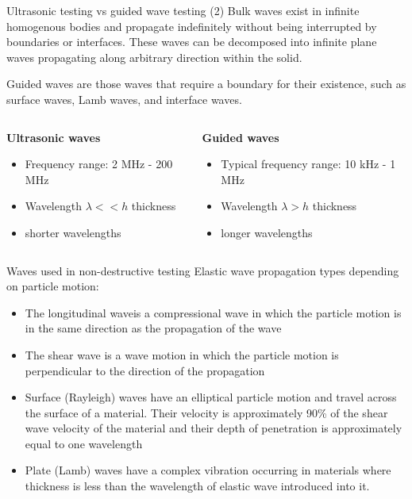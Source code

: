 \documentclass[10pt,aspectratio=169]{beamer} %
\begin{document}
\begin{frame}{Ultrasonic testing vs guided wave testing (2)}
\alert{Bulk waves} exist in infinite homogenous bodies and propagate indefinitely without being interrupted by boundaries or interfaces. 
These waves can be decomposed into infinite plane waves propagating along arbitrary direction within the solid.

\alert{Guided waves} are those waves that require a boundary for their existence, such as surface waves, Lamb waves, and interface waves.
\vspace{5mm}
\begin{columns}[T]
	\begin{column}{0.5\textwidth}
	\textbf{Ultrasonic waves}	
	\begin{itemize}
		\item Frequency range: 2 MHz - 200 MHz
		\item Wavelength \(\lambda << h\) thickness 
		\item shorter wavelengths
	\end{itemize}
	\end{column}
	\begin{column}{0.5\textwidth}
	\textbf{Guided waves}	
	\begin{itemize}
		\item Typical frequency range: 10 kHz - 1 MHz
		\item Wavelength \(\lambda > h\) thickness 
		\item longer wavelengths
	\end{itemize}
	\end{column}
\end{columns}			
\end{frame}
\note{
	
}
\begin{frame}{Waves used in non-destructive testing}
Elastic wave propagation types depending on particle motion:
\begin{itemize}
	\item  \alert{The longitudinal wave}is a compressional wave in which the particle motion is in the same direction as the propagation of the wave
	\item \alert{The shear wave} is a wave motion in which the particle motion is perpendicular to the direction of the propagation
	\item \alert{Surface (Rayleigh) waves} have an elliptical particle motion and travel across the surface of a material. Their velocity is approximately 90\% of the shear wave velocity of the material and their depth of penetration is approximately equal to one
	wavelength
	\item \alert{Plate (Lamb) waves} have a complex vibration occurring in materials where thickness is less than the wavelength of elastic wave introduced into it.
\end{itemize}
		
\end{frame}
\end{document}
